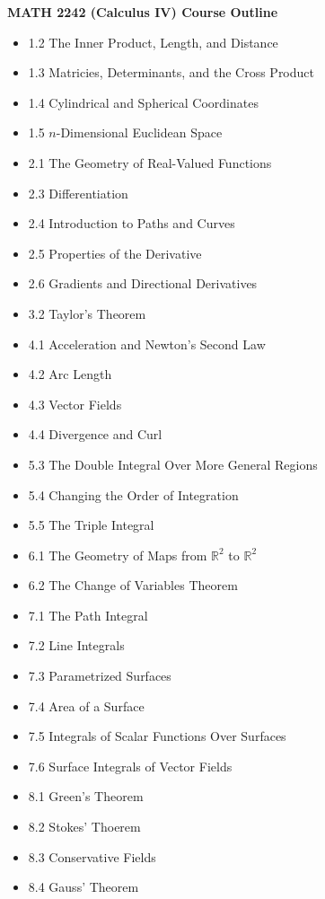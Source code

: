 \documentclass[11pt]{article}
\theoremstyle{plain}
\theoremstyle{definition}
\theoremstyle{remark}
\begin{document}
\noindent\textbf{
  MATH 2242 (Calculus IV) Course Outline
}

\begin{itemize}
  \item 1.2 The Inner Product, Length, and Distance
  \item 1.3 Matricies, Determinants, and the Cross Product
  \item 1.4 Cylindrical and Spherical Coordinates
  \item 1.5 \(n\)-Dimensional Euclidean Space
  \item 2.1 The Geometry of Real-Valued Functions
  \item 2.3 Differentiation
  \item 2.4 Introduction to Paths and Curves
  \item 2.5 Properties of the Derivative
  \item 2.6 Gradients and Directional Derivatives
  \item 3.2 Taylor's Theorem
  \item 4.1 Acceleration and Newton's Second Law
  \item 4.2 Arc Length
  \item 4.3 Vector Fields
  \item 4.4 Divergence and Curl
  \item 5.3 The Double Integral Over More General Regions
  \item 5.4 Changing the Order of Integration
  \item 5.5 The Triple Integral
  \item 6.1 The Geometry of Maps from \(\mathbb R^2\) to \(\mathbb R^2\)
  \item 6.2 The Change of Variables Theorem
  \item 7.1 The Path Integral
  \item 7.2 Line Integrals
  \item 7.3 Parametrized Surfaces
  \item 7.4 Area of a Surface
  \item 7.5 Integrals of Scalar Functions Over Surfaces
  \item 7.6 Surface Integrals of Vector Fields
  \item 8.1 Green's Theorem
  \item 8.2 Stokes' Thoerem
  \item 8.3 Conservative Fields
  \item 8.4 Gauss' Theorem
\end{itemize}
\end{document}
